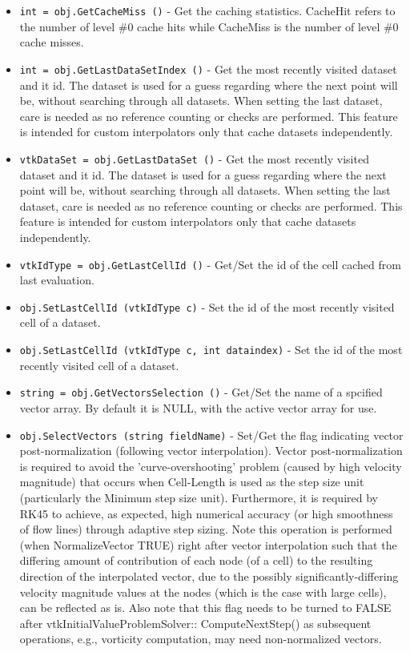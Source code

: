 \begin{itemize}
\item  \verb|int = obj.GetCacheMiss ()| -  Get the caching statistics. CacheHit refers to the number of level \#0 cache
 hits while CacheMiss is the number of level \#0 cache misses.

\item  \verb|int = obj.GetLastDataSetIndex ()| -  Get the most recently visited dataset and it id. The dataset is used 
 for a guess regarding where the next point will be, without searching
 through all datasets. When setting the last dataset, care is needed as
 no reference counting or checks are performed. This feature is intended
 for custom interpolators only that cache datasets independently.

\item  \verb|vtkDataSet = obj.GetLastDataSet ()| -  Get the most recently visited dataset and it id. The dataset is used 
 for a guess regarding where the next point will be, without searching
 through all datasets. When setting the last dataset, care is needed as
 no reference counting or checks are performed. This feature is intended
 for custom interpolators only that cache datasets independently.

\item  \verb|vtkIdType = obj.GetLastCellId ()| -  Get/Set the id of the cell cached from last evaluation.

\item  \verb|obj.SetLastCellId (vtkIdType c)| -  Set the id of the most recently visited cell of a dataset.

\item  \verb|obj.SetLastCellId (vtkIdType c, int dataindex)| -  Set the id of the most recently visited cell of a dataset.

\item  \verb|string = obj.GetVectorsSelection ()| -  Get/Set the name of a spcified vector array. By default it is NULL, with
 the active vector array for use.

\item  \verb|obj.SelectVectors (string fieldName)| -  Set/Get the flag indicating vector post-normalization (following vector
 interpolation). Vector post-normalization is required to avoid the 
 'curve-overshooting' problem (caused by high velocity magnitude) that
 occurs when Cell-Length is used as the step size unit (particularly the
 Minimum step size unit). Furthermore, it is required by RK45 to achieve,
 as expected, high numerical accuracy (or high smoothness of flow lines)
 through adaptive step sizing. Note this operation is performed (when
 NormalizeVector TRUE) right after vector interpolation such that the
 differing amount of contribution of each node (of a cell) to the
 resulting direction of the interpolated vector, due to the possibly
 significantly-differing velocity magnitude values at the nodes (which is
 the case with large cells), can be reflected as is. Also note that this
 flag needs to be turned to FALSE after vtkInitialValueProblemSolver::
 ComputeNextStep() as subsequent operations, e.g., vorticity computation, 
 may need non-normalized vectors.


\end{itemize}
